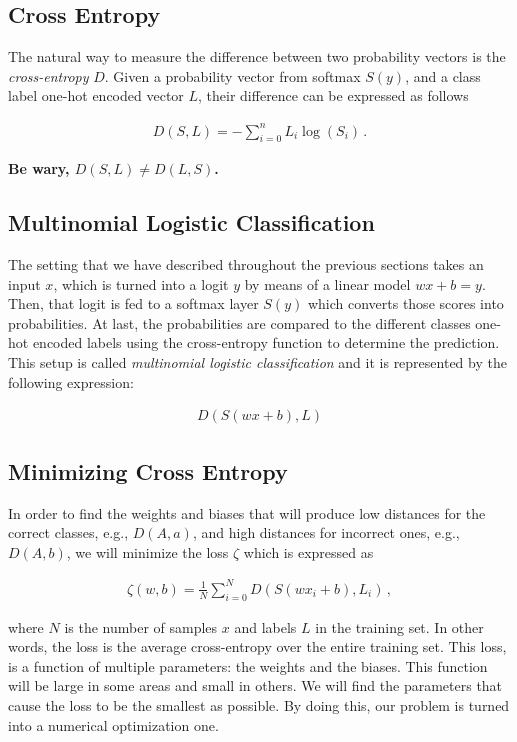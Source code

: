 \documentclass[english, 11pt]{article}
\begin{document}
	\subsection{Cross Entropy}

	The natural way to measure the difference between two probability vectors is the \emph{cross-entropy} $D$. Given a probability vector from softmax $S(y)$, and a class label one-hot encoded vector $L$, their difference can be expressed as follows

	\begin{align*}
		D(S, L) = -\displaystyle\sum_{i=0}^{n}L_i \log(S_i)\,.
	\end{align*}

	\textbf{Be wary, $D(S, L) \neq D(L, S)$.}

	\subsection{Multinomial Logistic Classification}

	The setting that we have described throughout the previous sections takes an input $x$, which is turned into a logit $y$ by means of a linear model $wx + b = y$. Then, that logit is fed to a softmax layer $S(y)$ which converts those scores into probabilities. At last, the probabilities are compared to the different classes one-hot encoded labels using the cross-entropy function to determine the prediction. This setup is called \emph{multinomial logistic classification} and it is represented by the following expression:

	\begin{align*}
		D(S(wx + b), L)
	\end{align*}

	\subsection{Minimizing Cross Entropy}

	In order to find the weights and biases that will produce low distances for the correct classes, e.g., $D(A,a)$, and high distances for incorrect ones, e.g., $D(A,b)$, we will minimize the loss $\zeta$ which is expressed as

	\begin{align*}
		\zeta(w, b) = \displaystyle\frac{1}{N}\displaystyle\sum_{i=0}^N D(S(wx_i+b),L_i)\,,
	\end{align*}

	where $N$ is the number of samples $x$ and labels $L$ in the training set. In other words, the loss is the average cross-entropy over the entire training set. This loss, is a function of multiple parameters: the weights and the biases. This function will be large in some areas and small in others. We will find the parameters that cause the loss to be the smallest as possible. By doing this, our problem is turned into a numerical optimization one.
\end{document}
